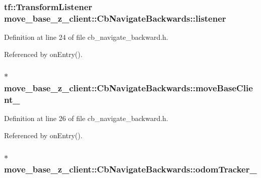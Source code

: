 \subsubsection[{\texorpdfstring{listener}{listener}}]{\setlength{\rightskip}{0pt plus 5cm}tf\+::\+Transform\+Listener move\+\_\+base\+\_\+z\+\_\+client\+::\+Cb\+Navigate\+Backwards\+::listener}\hypertarget{classmove__base__z__client_1_1CbNavigateBackwards_a13939ba95a738b73e0e26f215791d675}{}\label{classmove__base__z__client_1_1CbNavigateBackwards_a13939ba95a738b73e0e26f215791d675}


Definition at line 24 of file cb\+\_\+navigate\+\_\+backward.\+h.



Referenced by on\+Entry().

\subsubsection[{\texorpdfstring{move\+Base\+Client\+\_\+}{moveBaseClient_}}]{$\ast$ move\+\_\+base\+\_\+z\+\_\+client\+::\+Cb\+Navigate\+Backwards\+::move\+Base\+Client\+\_\+}\hypertarget{classmove__base__z__client_1_1CbNavigateBackwards_ac94348112821680532527fa006651a6c}{}\label{classmove__base__z__client_1_1CbNavigateBackwards_ac94348112821680532527fa006651a6c}


Definition at line 26 of file cb\+\_\+navigate\+\_\+backward.\+h.



Referenced by on\+Entry().

\subsubsection[{\texorpdfstring{odom\+Tracker\+\_\+}{odomTracker_}}]{$\ast$ move\+\_\+base\+\_\+z\+\_\+client\+::\+Cb\+Navigate\+Backwards\+::odom\+Tracker\+\_\+}\hypertarget{classmove__base__z__client_1_1CbNavigateBackwards_a5fd01913a156bac8551001c102e7459a}{}\label{classmove__base__z__client_1_1CbNavigateBackwards_a5fd01913a156bac8551001c102e7459a}


